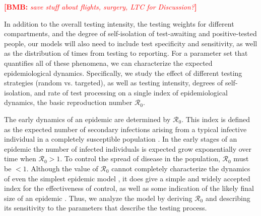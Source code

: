 \documentclass[12pt]{article}
\newcommand{\comment}{\showcomment}
\newcommand{\showcomment}[3]{\textcolor{#1}{\textbf{[#2: }\textsl{#3}\textbf{]}}}
\newcommand{\ali}[1]{\comment{magenta}{Ali}{#1}}
\newcommand{\bmb}[1]{\comment{red}{BMB}{#1}}
\newcommand{\Rnum}{\mathcal{R}_0}
\theoremstyle{definition} %
\begin{document}
\bmb{save stuff about flights, surgery, LTC for Discussion?}

In addition to the overall testing intensity, the testing weights for different compartments, and the degree of self-isolation of test-awaiting and positive-tested people,
our models will also need to include test specificity and sensitivity, as well as the distribution of times
from testing to reporting. For a parameter set that quantifies all of these phenomena,
we can characterize the expected epidemiological dynamics. Specifically, we study the effect of different testing strategies (random vs. targeted), as well as testing intensity, degrees of self-isolation, and rate of test processing on a single index of epidemiological dynamics, the basic reproduction number $\Rnum$.

The early dynamics of an epidemic are determined by $\Rnum$. This index is defined as the expected number of secondary infections arising from a typical infective individual in a completely susceptible population \citep{dietz1993estimation}. In the early stages of an epidemic the number of infected individuals is expected grow exponentially over time when $\Rnum>1$. To control the spread of disease in the population, $\Rnum$ must be $<1$.
Although the value of $\Rnum$ cannot completely characterize the dynamics of even the simplest epidemic model
\citep{shaw2021what},
it does give a simple and widely accepted index for the effectiveness of control, as well as some indication
of the likely final size of an epidemic \citep{ma2006generality}. Thus, we analyze the model by deriving $\Rnum$ and describing its
sensitivity to the parameters that describe the testing process.


\end{document}
